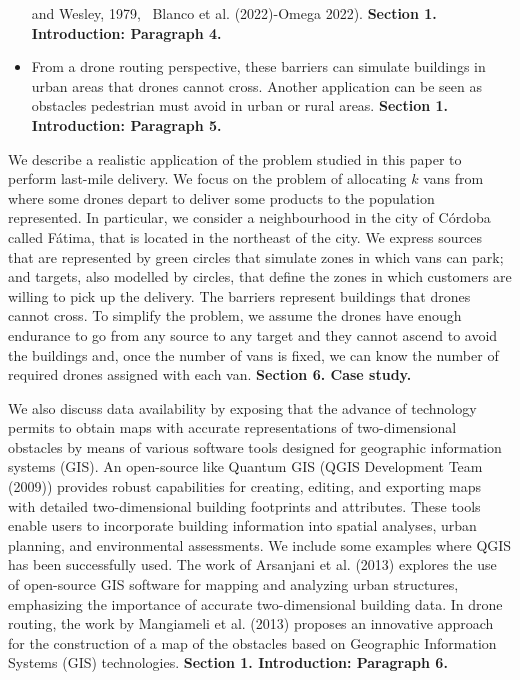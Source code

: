 \documentclass{article}
\newenvironment{reviewer}{\setcounter{pointcounter}{1}}{}
\newcommand{\point}{\text{{\selectfont \thepointcounter} \stepcounter{pointcounter}}}
\begin{document}
\begin{reviewer}
\begin{tcolorbox}[breakable,enhanced,coltitle=black,colback=red!5!white,colframe=red!75!black,title=\textbf{Answer R1.\point},borderline={1pt}{0pt}{black},boxrule=0pt]
\begin{itemize}
				and Wesley, 1979, {\color{red} Blanco et al. (2022)-Omega 2022}). \textbf{Section 1. Introduction: Paragraph 4.}
				\item From a drone routing perspective, these barriers can simulate buildings in urban areas that drones cannot cross. Another application can be seen as obstacles pedestrian
				must avoid in urban or rural areas. \textbf{Section 1. Introduction: Paragraph 5.}
			\end{itemize}
			We describe a realistic application of the problem studied in this paper to perform last-mile delivery. We focus on the problem of allocating $k$ vans from where some drones depart to deliver some products to the population represented. In particular, we consider a neighbourhood in the city of Córdoba called Fátima, that is located in the northeast of the city. We express sources that are represented by green circles that simulate zones in which vans can park; and targets, also modelled by circles,  that define the zones in which customers are willing to pick up the delivery. The barriers represent buildings that drones cannot cross. To simplify the problem, we assume the drones have enough endurance to go from any source to any target and they cannot ascend to avoid the buildings and, once the number of vans is fixed, we can know the number of required drones assigned with each van. \textbf{Section 6. Case study. }
			
			We also discuss data availability by exposing that the advance of technology permits to obtain maps with accurate representations of two-dimensional obstacles by means of various software tools designed for geographic information systems (GIS). An open-source like Quantum GIS (QGIS Development Team (2009)) provides robust capabilities for creating, editing, and exporting maps with detailed two-dimensional building footprints and attributes. These tools enable users to incorporate building information into spatial analyses, urban planning, and environmental assessments. We include some examples where QGIS has been successfully used. The work of Arsanjani et al. (2013) explores the use of open-source GIS software for mapping and analyzing urban structures, emphasizing the importance of accurate two-dimensional building data. In drone routing, the work by Mangiameli et al. (2013) proposes an innovative approach	for the construction of a map of the obstacles based on Geographic Information Systems (GIS) technologies. \textbf{Section 1. Introduction: Paragraph 6.}
		\end{tcolorbox}
		

\end{reviewer}
\end{document}
